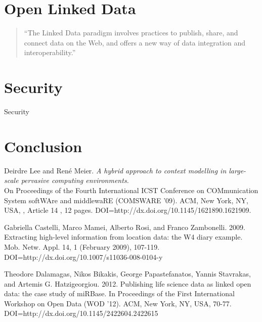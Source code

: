 \documentclass[]{report}
\begin{document}
% 
%

\section{Open Linked Data}

\begin{quote}
``The Linked Data paradigm
involves practices to publish, share, and connect data on the
Web, and offers a new way of data integration and interoperability.''\cite{3}
\end{quote}



% 
%

\section{Security}
Security


% 
%


\section{Conclusion}


% 
%

\medskip

\begin{thebibliography}{99}
Deirdre Lee and René Meier. 
\textit{ A hybrid approach to context modelling in large-scale pervasive computing environments.}\\ 
On Proceedings of the Fourth International ICST Conference on COMmunication System softWAre and middlewaRE (COMSWARE '09). ACM, New York, NY, USA, , Article 14 , 12 pages. DOI=http://dx.doi.org/10.1145/1621890.1621909.

Gabriella Castelli, Marco Mamei, Alberto Rosi, and Franco Zambonelli. 2009. Extracting high-level information from location data: the W4 diary example. Mob. Netw. Appl. 14, 1 (February 2009), 107-119. DOI=http://dx.doi.org/10.1007/s11036-008-0104-y
 
Theodore Dalamagas, Nikos Bikakis, George Papastefanatos, Yannis Stavrakas, and Artemis G. Hatzigeorgiou. 2012. Publishing life science data as linked open data: the case study of miRBase. In Proceedings of the First International Workshop on Open Data (WOD '12). ACM, New York, NY, USA, 70-77. DOI=http://dx.doi.org/10.1145/2422604.2422615
 




\end{thebibliography}
\end{document}
